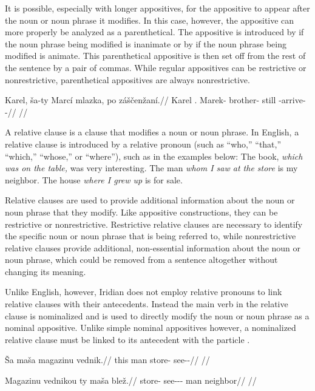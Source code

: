 It is possible, especially with longer appositives, for the appositive to appear
after the noun or noun phrase it modifies. In this case, however, the appositive
can more properly be analyzed as a parenthetical. The appositive is introduced
by  if the noun phrase being modified is inanimate or by 
if the noun phrase being modified is animate. This parenthetical appositive is
then set off from the rest of the sentence by a pair of commas. While regular
appositives can be restrictive or nonrestrictive, parenthetical appositives are
always nonrestrictive.

\pex
\begingl
  \gla Karel, ša-ty Marcí mlazka, po záščenžaní.//
  \glb Karel \Anim{}.\Lnk{} Marek-\Gen{} brother-\Dim{} still \Neg{}-arrive-\Av{}-\Ret{}//
  \glft {}//
\endgl
\xe

A relative clause is a clause that modifies a noun or
noun phrase. In English, a relative clause is introduced by a
relative pronoun (such as ``who,'' ``that,'' ``which,'' ``whose,'' or
``where''), such as in the examples below:
\pex
  \a The book, \emph{which was on the table,} was very interesting.
  \a The man \emph{whom I saw at the store} is my neighbor.
  \a The house \emph{where I grew up} is for sale.
\xe

Relative clauses are used to provide additional information about the noun or
noun phrase that they modify. Like appositive constructions, they can be
restrictive or nonrestrictive. Restrictive relative clauses are necessary to
identify the specific noun or noun phrase that is being referred to, while
nonrestrictive relative clauses provide additional, non-essential information
about the noun or noun phrase, which could be removed from a sentence altogether
without changing its meaning.

Unlike English, however, Iridian does not employ relative pronouns to link
relative clauses with their antecedents. Instead the main verb in the relative
clause is nominalized and is used to directly modify the noun or noun phrase as
a nominal appositive. Unlike simple nominal appositives however, a nominalized
relative clause must be linked to its antecedent with the particle . 

\pex
\a\begingl
  \gla Ša maša magazinu vednik.//
  \glb this man store-\Ins{} see-\Pv{}-\Pf{}//
  \glft {}//
\endgl

\a\begingl
  \gla Magazinu vednikou ty maša blež.//
  \glb store-\Ins{} see-\Pv{}-\Pf{}-\Nz{} \Lnk{} man neighbor//
  \glft {}//
\endgl
\xe

